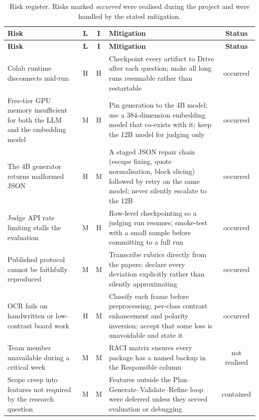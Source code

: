 {\footnotesize\singlespacing
\setlength{\tabcolsep}{4pt}
\begin{longtable}{|p{3.6cm}|c|c|p{6.4cm}|c|}
\caption{Risk register. Risks marked \emph{occurred} were realised during the
project and were handled by the stated mitigation.}
\label{tab:risks}\\
\hline
\textbf{Risk} & \textbf{L} & \textbf{I} & \textbf{Mitigation} & \textbf{Status} \\
\hline
\endfirsthead
\hline
\textbf{Risk} & \textbf{L} & \textbf{I} & \textbf{Mitigation} & \textbf{Status} \\
\hline
\endhead
\hline
\endfoot
\hline
\endlastfoot

Colab runtime disconnects mid-run &
  H & H &
  Checkpoint every artifact to Drive after each question; make all long runs
  resumable rather than restartable &
  occurred \\
\hline
Free-tier GPU memory insufficient for both the LLM and the embedding model &
  M & H &
  Pin generation to the 4B model; use a 384-dimension embedding model that
  co-exists with it; keep the 12B model for judging only &
  occurred \\
\hline
The 4B generator returns malformed JSON &
  H & M &
  A staged JSON repair chain (escape fixing, quote normalisation, block slicing)
  followed by retry on the same model; never silently escalate to the 12B &
  occurred \\
\hline
Judge API rate limiting stalls the evaluation &
  M & H &
  Row-level checkpointing so a judging run resumes; smoke-test with a small
  sample before committing to a full run &
  occurred \\
\hline
Published protocol cannot be faithfully reproduced &
  M & M &
  Transcribe rubrics directly from the papers; declare every deviation explicitly
  rather than silently approximating &
  occurred \\
\hline
OCR fails on handwritten or low-contrast board work &
  H & M &
  Classify each frame before preprocessing; per-class contrast enhancement and
  polarity inversion; accept that some loss is unavoidable and state it &
  occurred \\
\hline
Team member unavailable during a critical week &
  M & M &
  RACI matrix ensures every package has a named backup in the Responsible column &
  not realised \\
\hline
Scope creep into features not required by the research question &
  M & M &
  Features outside the Plan--Generate--Validate--Refine loop were deferred unless
  they served evaluation or debugging &
  contained \\
\hline
\end{longtable}
}


